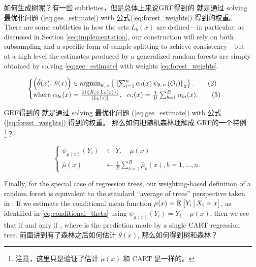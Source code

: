\documentclass[aos]{imsart}
\theoremstyle{plain}
\theoremstyle{definition}
\theoremstyle{remark}
\begin{document}
\begin{CJK}{UTF8}{gbsn}
如何生成树呢？有一些 subtleties，但是总体上来说GRF得到的  就是通过 solving 最优化问题 (\ref{eq:gee_estimate}) with 公式(\ref{eq:forest_weights}) 得到的权重。 There are some subtleties in how the sets $L_b(x)$ are defined---in particular,
as discussed in Section \ref{sec:implementation}, our construction will rely on both
subsampling and a specific form of sample-splitting to achieve consistency---but at a high level
the estimates  produced by a generalized random forests are simply
obtained by solving \eqref{eq:gee_estimate} with weights \eqref{eq:forest_weights}.


\begin{equation*}
\begin{cases}
\p{\htheta(x), \, \hnu(x)} \in \argmin_{\theta, \, \nu} \cb{\Norm{\sum_{i = 1}^n \alpha_i(x) \, \psi_{\theta, \, \nu}\p{O_i}}_2}. \qquad (2) \\
\text{where } \alpha_{bi}(x) = \frac{\1\p{\cb{X_i \in L_b(x)}}}{\abs{L_b(x)}}, \ \ \alpha_i(x) = \frac{1}{B} \sum_{b = 1}^B \alpha_{bi}(x).  \qquad (3)
\end{cases}
\end{equation*}


GRF得到的  就是通过 solving 最优化问题 (\ref{eq:gee_estimate}) with 公式(\ref{eq:forest_weights}) 得到的权重。 那么如何把随机森林理解成 GRF的一个特例\footnote{注意，这里只是验证了估计 $\mu(x)$ 和 CART 是一样的。}？

$$
\begin{cases}
\psi_{\mu(x)}(Y_i) &\leftarrow Y_i - \mu(x) \\
\hat{\mu}(x) &\leftarrow \frac{1}{B} \sum_{b=1}^B \hat{\mu}_b(x), b=1, ..., n. 
\end{cases}
$$


Finally, for the special case of regression trees, our weighting-based definition of a random forest is equivalent to the standard ``average of trees'' perspective taken in \citet{breiman2001random}:
If we estimate the conditional mean function $\mu(x) = \mathbb{E}_{}\left[Y_i \,\big|\, X_i = x\right]$, as identified in \eqref{eq:conditional_theta} using
$\psi_{\mu(x)}(Y_i) = Y_i - \mu(x)$, then we see that
if and only if
,
where  is the
prediction made by a single CART regression tree. 前面讲到有了森林之后如何估计 $\theta(x)$, 那么如何得到树和森林？


\end{CJK}
\end{document}
